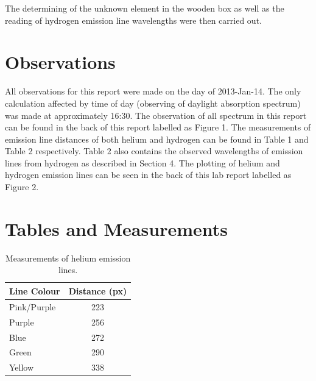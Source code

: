 \documentclass{article}
\begin{document}
The determining of the unknown element in the wooden box as well as the 
reading of hydrogen 
emission line wavelengths were then carried out.\\



\section{Observations}

All observations for this report were made on the day of 2013-Jan-14. The only
calculation affected by time of day (observing of daylight absorption spectrum)
was made at approximately 16:30. The observation of all spectrum in this report
can be found in the back of this report labelled as Figure 1. The measurements
of emission line distances of both helium and hydrogen can be found in Table 1
and Table 2 respectively. Table 2 also contains the observed wavelengths
of emission lines from hydrogen as described in Section 4. The plotting of helium
and hydrogen emission lines can be seen in the back of this lab report labelled as
Figure 2.



\section{Tables and Measurements}
\label{sec:tnm}

\begin{table}[h]
\begin{center}
\begin{tabular}{l c}
\hline
Line Colour & Distance (px)\\
\hline
\hline
Pink/Purple & 223\\
Purple & 256\\
Blue & 272\\
Green & 290\\
Yellow & 338\\
\hline
\end{tabular}
\end{center}
\caption{Measurements of helium emission lines.\label{tab:helium}}
\end{table}
\end{document}
